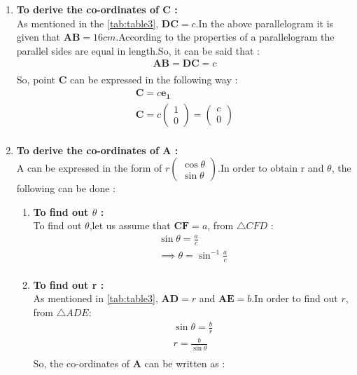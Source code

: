 \documentclass{article}
\newcommand{\myvec}[1]{\ensuremath{\begin{pmatrix}#1\end{pmatrix}}}
\let\vec\mathbf
\begin{document}
\begin{enumerate}
	\item \textbf{To derive the co-ordinates of C :}\\
		As mentioned in the \ref{tab:table3}, $\vec{DC} = c$.In the above parallelogram it is given that $\vec{AB} = 16cm$.According to the properties of a parallelogram the parallel sides are equal in length.So, it can be said that : \\
		\begin{align}
			 \vec{AB} = \vec{DC} = c\\
		\end{align}
So, point $\vec{C}$ can be expressed in the following way :\\
		\begin{align}
			\vec{C} = c\vec{e_1}\\
			\vec{C} = c\myvec{1\\0} = \myvec{c\\0}\\
		\end{align}
	\item \textbf{To derive the co-ordinates of A :}\\
		A can be expressed in the form of $r\myvec{\cos{\theta}\\\sin{\theta}}$.In order to obtain r and $\theta$, the following can be done : \\
		\begin{enumerate}
			\item \textbf{To find out $\theta$ :}\\
To find out $\theta$,let us assume that $\vec{CF} = a$, from $\triangle{CFD}$ :\\
		\begin{align}
			\sin{\theta} = \frac{a}{c}\\
			\implies \theta = \sin^{-1}{\frac{a}{c}} \\
		\end{align}
	\item \textbf{To find out r :}\\
		As mentioned in \ref{tab:table3}, $\vec{AD} = r$ and $\vec{AE} = b$.In order to find out $r$, from $\triangle{ADE}$:\\
		\begin{align}
			\sin{\theta} = \frac{b}{r}\\
			r = \frac{b}{\sin{\theta}}\\
		\end{align}
So, the co-ordinates of $\vec{A}$ can be written as :\\

\end{enumerate}
\end{enumerate}
\end{document}
